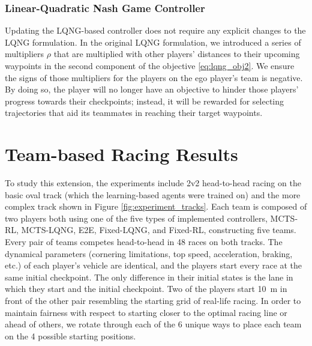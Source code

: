 \subsubsection{Linear-Quadratic Nash Game Controller}
Updating the LQNG-based controller does not require any explicit changes to the LQNG formulation. In the original LQNG formulation, we introduced a series of multipliers $\rho$ that are multiplied with other players' distances to their upcoming waypoints in the second component of the objective \eqref{eq:lqng_obj2}. We ensure the signs of those multipliers for the players on the ego player's team is negative. By doing so, the player will no longer have an objective to hinder those players' progress towards their checkpoints; instead, it will be rewarded for selecting trajectories that aid its teammates in reaching their target waypoints. 

\section{Team-based Racing Results}
To study this extension, the experiments include 2v2 head-to-head racing on the basic oval track (which the learning-based agents were trained on) and the more complex track shown in Figure \ref{fig:experiment_tracks}. Each team is composed of two players both using one of the five types of implemented controllers, MCTS-RL, MCTS-LQNG, E2E, Fixed-LQNG, and Fixed-RL, constructing five teams. Every pair of teams competes head-to-head in 48 races on both tracks. The dynamical parameters (cornering limitations, top speed, acceleration, braking, etc.) of each player's vehicle are identical, and the players start every race at the same initial checkpoint. The only difference in their initial states is the lane in which they start and the initial checkpoint. Two of the players start \SI{10}{\meter} in front of the other pair resembling the starting grid of real-life racing. In order to maintain fairness with respect to starting closer to the optimal racing line or ahead of others, we rotate through each of the 6 unique ways to place each team on the 4 possible starting positions.

